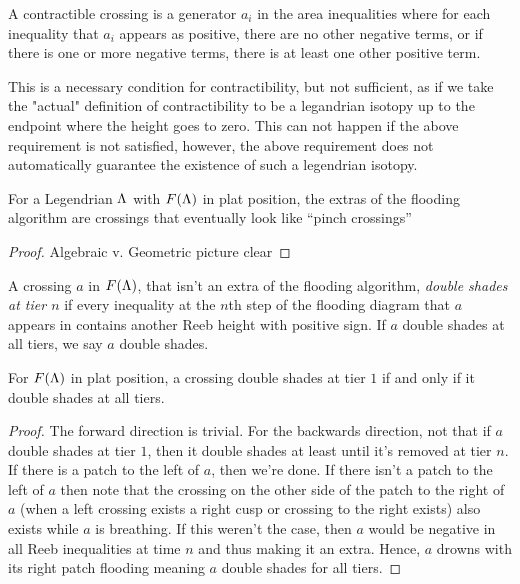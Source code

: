 \documentclass[11pt,oneside]{amsart}
\begin{document}
A contractible crossing is a generator $a_i$ in the area inequalities where for each inequality that $a_i$ appears as positive, there are no other negative terms, or if there is one or more negative terms, there is at least one other positive term.

This is a necessary condition for contractibility, but not sufficient, as if we take the "actual" definition of contractibility to be a legandrian isotopy up to the endpoint where the height goes to zero. This can not happen if the above requirement is not satisfied, however, the above requirement does not automatically guarantee the existence of such a legendrian isotopy. 

\begin{lemma}
    \label{lem:extradesc}
    For a Legendrian $\Lambda$ with $F(\Lambda)$ in plat position, the extras of the flooding algorithm are crossings that eventually look like ``pinch crossings''
\end{lemma}
\begin{proof}
    Algebraic v. Geometric picture clear \TODO
\end{proof}

\begin{definition}
    \label{def:doubleshade}
    A crossing $a$ in $F(\Lambda)$, that isn't an extra of the flooding algorithm, \textit{double shades at tier $n$} if every inequality at the $n$th step of the flooding diagram that $a$ appears in contains another Reeb height with positive sign. If $a$ double shades at all tiers, we say $a$ double shades.
\end{definition}


\begin{lemma}
    \label{lem:doubleshadecrit}
        For $F(\Lambda)$ in plat position, a crossing double shades at tier $1$ if and only if it double shades at all tiers.
\end{lemma}
\begin{proof}
    The forward direction is trivial. For the backwards direction, not that if $a$ double shades at tier $1$, then it double shades at least until it's removed at tier $n$. If there is a patch to the left of $a$, then we're done. If there isn't a patch to the left of $a$ then note that the crossing on the other side of the patch to the right of $a$ (when a left crossing exists a right cusp or crossing to the right exists) also exists while $a$ is breathing. If this weren't the case, then $a$ would be negative in all Reeb inequalities at time $n$ and thus making it an extra. Hence, $a$ drowns with its right patch flooding meaning $a$ double shades for all tiers.
\end{proof}
\end{document}

